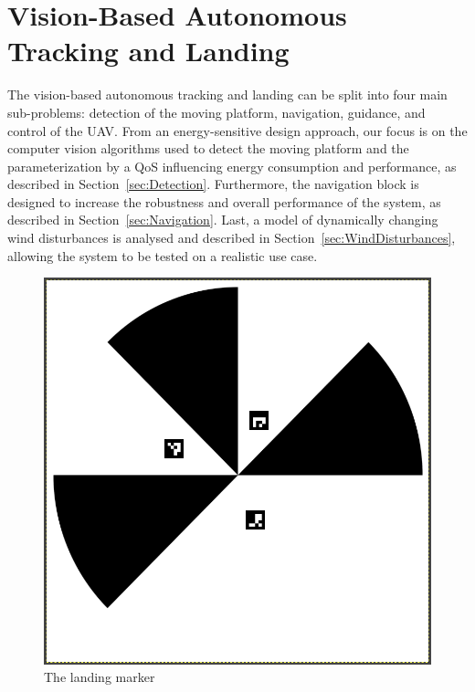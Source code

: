\documentclass[conference]{IEEEtran}
\begin{document}
\section{Vision-Based Autonomous Tracking and Landing}
\label{sec:landing}

The vision-based autonomous tracking and landing can be split into
four main sub-problems: detection of the moving platform, navigation,
guidance, and control of the UAV. From an energy-sensitive design
approach, our focus is on the computer vision algorithms used to
detect the moving platform and the parameterization by a QoS
influencing energy consumption and performance, as described in
Section~\ref{sec:Detection}. Furthermore, the navigation block is
designed to increase the robustness and overall performance of the
system, as described in Section~\ref{sec:Navigation}. Last, a model of
dynamically changing wind disturbances is analysed and described in
Section~\ref{sec:WindDisturbances}, allowing the system to be tested
on a realistic use case.



\begin{figure}
\centering
\includegraphics[scale=0.15]{n-fold-for-landing.png}
\caption{The landing marker}
\label{fig:LandingMarker}
\end{figure}
\end{document}

